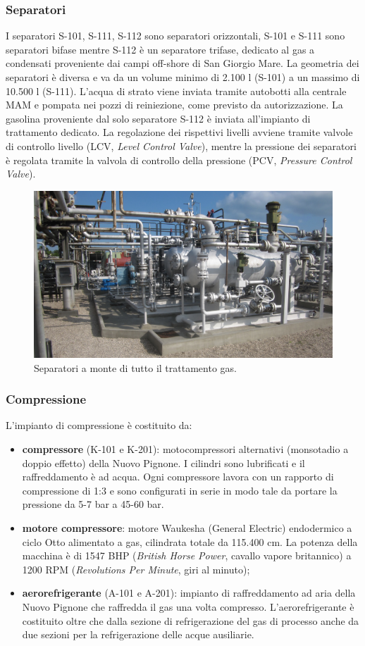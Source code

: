 \subsubsection*{Separatori}
I separatori S-101, S-111, S-112 sono separatori orizzontali, S-101 e S-111 sono separatori bifase mentre S-112 è un separatore trifase, dedicato al gas a condensati proveniente dai campi off-shore di San Giorgio Mare. La geometria dei separatori è diversa e va da un volume minimo di 2.100 l (S-101) a un massimo di 10.500 l (S-111). L'acqua di strato viene inviata tramite autobotti alla centrale MAM e pompata nei pozzi di reiniezione, come previsto da autorizzazione. La gasolina proveniente dal solo separatore S-112 è inviata all'impianto di trattamento dedicato.
La regolazione dei rispettivi livelli avviene tramite valvole di controllo livello (LCV, \textit{Level Control Valve}), mentre la pressione dei separatori è regolata tramite la valvola di controllo della pressione (PCV, \textit{Pressure Control Valve}).
\begin{figure}[htbp]
    \centering
    \includegraphics[width=.7\textwidth]{fig/test/centrale/separatori}
    \caption{Separatori a monte di tutto il trattamento gas.} 
    \label{fig:centrale-separatore}
\end{figure}

\subsubsection*{Compressione}
L'impianto di compressione è costituito da:
\begin{itemize}
	\item \textbf{compressore} (K-101 e K-201): motocompressori alternativi (monsotadio a doppio effetto) della Nuovo Pignone. I cilindri sono lubrificati e il raffreddamento è ad acqua. Ogni compressore lavora con un rapporto di compressione di 1:3 e sono configurati in serie in modo tale da portare la pressione da 5-7 bar a 45-60 bar.
	\item \textbf{motore compressore}: motore Waukesha (General Electric) endodermico a ciclo Otto alimentato a gas, cilindrata totale da 115.400 cm. La potenza della macchina è di 1547 BHP (\textit{British Horse Power}, cavallo vapore britannico) a 1200 RPM (\textit{Revolutions Per Minute}, giri al minuto);
	\item \textbf{aerorefrigerante} (A-101 e A-201): impianto di raffreddamento ad aria della Nuovo Pignone che raffredda il gas una volta compresso. L'aerorefrigerante è costituito oltre che dalla sezione di refrigerazione del gas di processo anche da due sezioni per la refrigerazione delle acque ausiliarie.
\end {itemize}

